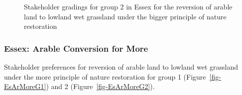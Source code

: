 \documentclass[
  12pt,
  letterpaper,
  DIV=11,
  numbers=noendperiod]{scrartcl}
\begin{document}
\begin{figure}[H]


\caption{\label{fig-EsArBigG2}Stakeholder gradings for group 2 in Essex
for the reversion of arable land to lowland wet grassland under the
bigger principle of nature restoration}

\end{figure}%

\newpage{}

\subsubsection{Essex: Arable Conversion for
More}\label{essex-arable-conversion-for-more}

Stakeholder preferences for reversion of arable land to lowland wet
grassland under the more principle of nature restoration for group 1
(Figure~\ref{fig-EsArMoreG1}) and 2 (Figure~\ref{fig-EsArMoreG2}).
\end{document}
